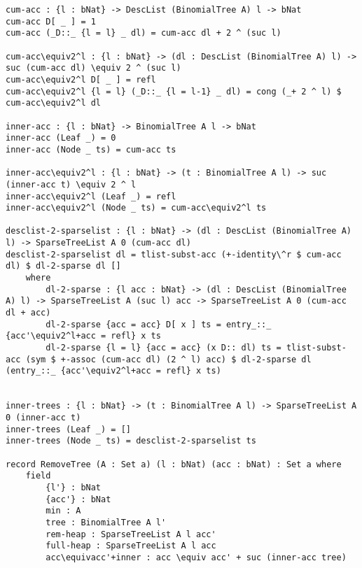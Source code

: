 \begin{lstlisting}[caption={Removing the minimum element},label={lst:appendix:heap:remove}]
cum-acc : {l : bNat} -> DescList (BinomialTree A) l -> bNat
cum-acc D[ _ ] = 1
cum-acc (_D::_ {l = l} _ dl) = cum-acc dl + 2 ^ (suc l)

cum-acc\equiv2^l : {l : bNat} -> (dl : DescList (BinomialTree A) l) -> suc (cum-acc dl) \equiv 2 ^ (suc l)
cum-acc\equiv2^l D[ _ ] = refl
cum-acc\equiv2^l {l = l} (_D::_ {l = l-1} _ dl) = cong (_+ 2 ^ l) $ cum-acc\equiv2^l dl

inner-acc : {l : bNat} -> BinomialTree A l -> bNat
inner-acc (Leaf _) = 0
inner-acc (Node _ ts) = cum-acc ts

inner-acc\equiv2^l : {l : bNat} -> (t : BinomialTree A l) -> suc (inner-acc t) \equiv 2 ^ l
inner-acc\equiv2^l (Leaf _) = refl
inner-acc\equiv2^l (Node _ ts) = cum-acc\equiv2^l ts

desclist-2-sparselist : {l : bNat} -> (dl : DescList (BinomialTree A) l) -> SparseTreeList A 0 (cum-acc dl)
desclist-2-sparselist dl = tlist-subst-acc (+-identity\^r $ cum-acc dl) $ dl-2-sparse dl []
    where
        dl-2-sparse : {l acc : bNat} -> (dl : DescList (BinomialTree A) l) -> SparseTreeList A (suc l) acc -> SparseTreeList A 0 (cum-acc dl + acc)
        dl-2-sparse {acc = acc} D[ x ] ts = entry_::_ {acc'\equiv2^l+acc = refl} x ts
        dl-2-sparse {l = l} {acc = acc} (x D:: dl) ts = tlist-subst-acc (sym $ +-assoc (cum-acc dl) (2 ^ l) acc) $ dl-2-sparse dl (entry_::_ {acc'\equiv2^l+acc = refl} x ts)


inner-trees : {l : bNat} -> (t : BinomialTree A l) -> SparseTreeList A 0 (inner-acc t)
inner-trees (Leaf _) = []
inner-trees (Node _ ts) = desclist-2-sparselist ts

record RemoveTree (A : Set a) (l : bNat) (acc : bNat) : Set a where
    field
        {l'} : bNat
        {acc'} : bNat
        min : A
        tree : BinomialTree A l'
        rem-heap : SparseTreeList A l acc'
        full-heap : SparseTreeList A l acc
        acc\equivacc'+inner : acc \equiv acc' + suc (inner-acc tree)



\end{lstlisting}
